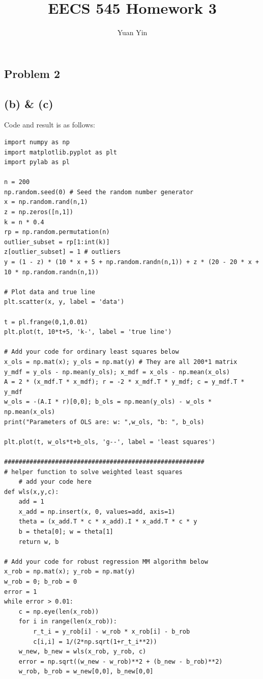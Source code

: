\documentclass[letterpaper,11pt]{article}
\author{Yuan Yin}
\title{EECS 545 Homework 3}
\begin{document}
\large
\maketitle
\begin{spacing}{1.2}  %
\section*{Problem 2}
\subsection*{(b) \& (c)}
Code and result is as follows:
\begin{lstlisting}
import numpy as np
import matplotlib.pyplot as plt
import pylab as pl

n = 200
np.random.seed(0) # Seed the random number generator
x = np.random.rand(n,1)
z = np.zeros([n,1])
k = n * 0.4
rp = np.random.permutation(n)
outlier_subset = rp[1:int(k)]
z[outlier_subset] = 1 # outliers
y = (1 - z) * (10 * x + 5 + np.random.randn(n,1)) + z * (20 - 20 * x + 10 * np.random.randn(n,1))

# Plot data and true line
plt.scatter(x, y, label = 'data')

t = pl.frange(0,1,0.01)
plt.plot(t, 10*t+5, 'k-', label = 'true line')

# Add your code for ordinary least squares below
x_ols = np.mat(x); y_ols = np.mat(y) # They are all 200*1 matrix
y_mdf = y_ols - np.mean(y_ols); x_mdf = x_ols - np.mean(x_ols)
A = 2 * (x_mdf.T * x_mdf); r = -2 * x_mdf.T * y_mdf; c = y_mdf.T * y_mdf
w_ols = -(A.I * r)[0,0]; b_ols = np.mean(y_ols) - w_ols * np.mean(x_ols)
print("Parameters of OLS are: w: ",w_ols, "b: ", b_ols)

plt.plot(t, w_ols*t+b_ols, 'g--', label = 'least squares')

#######################################################
# helper function to solve weighted least squares
    # add your code here
def wls(x,y,c):
    add = 1
    x_add = np.insert(x, 0, values=add, axis=1)
    theta = (x_add.T * c * x_add).I * x_add.T * c * y
    b = theta[0]; w = theta[1]
    return w, b

# Add your code for robust regression MM algorithm below
x_rob = np.mat(x); y_rob = np.mat(y)
w_rob = 0; b_rob = 0
error = 1
while error > 0.01:
    c = np.eye(len(x_rob))
    for i in range(len(x_rob)):
        r_t_i = y_rob[i] - w_rob * x_rob[i] - b_rob
        c[i,i] = 1/(2*np.sqrt(1+r_t_i**2))
    w_new, b_new = wls(x_rob, y_rob, c)
    error = np.sqrt((w_new - w_rob)**2 + (b_new - b_rob)**2)
    w_rob, b_rob = w_new[0,0], b_new[0,0]


\end{lstlisting}
\end{spacing}
\end{document}
